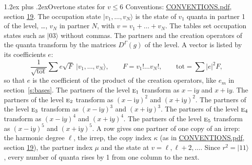\documentclass[10pt,a4paper]{article}
\makeatletter
\renewcommand\section{\@startsection{section}{1}{\z@}{-3ex plus -1ex minus -.2ex}%
  {1.2ex plus .2ex}{\normalfont\large\sffamily\bfseries\color{parttitle}}}
\numberwithin{equation}{section}
\newcommand{\irr}[1]{\text{\normalfont\scshape #1}}
\newcommand{\iunit}{\mathrm{i}}
\newcommand{\repD}[1]{D^{#1}}
\newcommand{\mult}{\kappa}
\newcommand{\intx}{\mu}
\newcommand{\occ}[1]{\lvert #1\rangle}
\makeatother
\begin{document}
\section{Overtone states for \texorpdfstring{$v \le 6$}{v \textleq\ 6}}\label{s:overtone_states}
Conventions: \href{../../CONVENTIONS.pdf}{CONVENTIONS.pdf}, section \href{../../CONVENTIONS.pdf\#conv.19}{19}.
\leavevmode\label{n:vector.occupation}\label{n:local.quanta.partner}\label{n:local.weight.occupation}The occupation state $\occ{v_1, \dots, v_N}$ is the state of $v_1$ quanta in partner 1 of the level, \dots, $v_N$ in partner $N$, with $v = v_1 + \dots + v_N$. The tables set occupation states such as $\occ{03}$ without commas. The partners and the creation operators of the quanta transform by the matrices $\repD{\Gamma}(g)$ of the level. A vector is listed by its coefficients $e$:
\begin{equation}\label{e:occupation}\frac{1}{\sqrt{\mathrm{tot}}}\sum e\sqrt{F}\;\occ{v_1, \dots, v_N},\qquad F = v_1!\dots v_N!,\qquad \mathrm{tot} = \sum |e|^2F,\end{equation}
so that $e$ is the coefficient of the product of the creation operators, like $e_m$ in section~\ref{s:bases}. The partners of the level $\irr{e}_{1}$ transform as $x - \iunit y$ and $x + \iunit y$. The partners of the level $\irr{e}_{2}$ transform as $(x - \iunit y)^{2}$ and $(x + \iunit y)^{2}$. The partners of the level $\irr{e}_{3}$ transform as $(x - \iunit y)^{3}$ and $(x + \iunit y)^{3}$. The partners of the level $\irr{e}_{4}$ transform as $(x - \iunit y)^{4}$ and $(x + \iunit y)^{4}$. The partners of the level $\irr{e}_{5}$ transform as $(x - \iunit y)^{5}$ and $(x + \iunit y)^{5}$. A row gives one partner of one copy of an irrep: the harmonic degree $\ell$, the irrep, the copy index $\mult$ (as in \href{../../CONVENTIONS.pdf}{CONVENTIONS.pdf}, section \href{../../CONVENTIONS.pdf\#conv.19}{19}), the partner index $\intx$ and the state at $v = \ell, \ell + 2, \dots$. Since $r^2 = \occ{11}$, every number of quanta rises by 1 from one column to the next.
\end{document}

